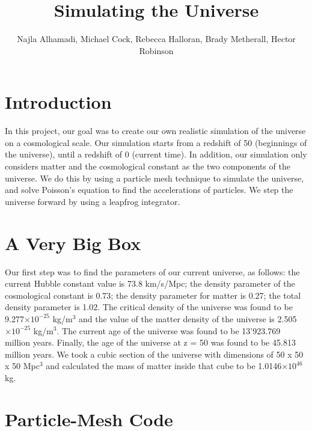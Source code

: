 \documentclass[10pt]{article}
\title{Simulating the Universe}
\author{Najla Alhamadi, Michael Cock, Rebecca Halloran, Brady Metherall, Hector Robinson}
\providecommand{\e}[1]{\ensuremath{\times 10^{#1}}}
\begin{document}
\maketitle
\section{Introduction}
	In this project, our goal was to create our own realistic simulation of the universe on a cosmological scale. Our simulation starts from a redshift of 50 (beginnings of the universe), until a redshift of 0 (current time). In addition, our simulation only considers matter and the cosmological constant as the two components of the universe. We do this by using a particle mesh technique to simulate the universe, and solve Poisson's equation to find the accelerations of particles. We step the universe forward by using a leapfrog integrator.
	
\section{A Very Big Box}
	Our first step was to find the parameters of our current universe, as follows: the current Hubble constant value is 73.8 km/s/Mpc; the density parameter of the cosmological constant is 0.73; the density parameter for matter is 0.27; the total density parameter is 1.02. The critical density of the universe was found to be 9.277\e{-25} kg/m$^3$ and the value of the matter density of the universe is 2.505\e{-25} kg/m$^3$. The current age of the universe was found to be 13'923.769 million years. Finally, the age of the universe at z = 50 was found to be 45.813 million years. We took a cubic section of the universe with dimensions of 50 x 50 x 50 Mpc$^3$ and calculated the mass of matter inside that cube to be 1.0146\e{46} kg.  
	
\section{Particle-Mesh Code}
\end{document}
